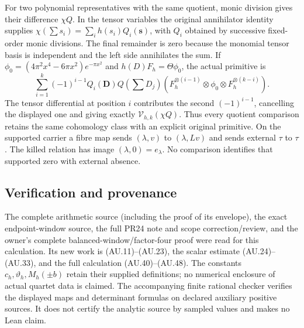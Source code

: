 For two polynomial representatives with the same quotient, monic
division gives their difference $\chi Q$. In the tensor variables
the original annihilator identity supplies
$\chi(\sum s_i)=\sum_i h(s_i)Q_i(\mathbf s)$, with $Q_i$ obtained
by successive fixed-order monic divisions. The final remainder is
zero because the monomial tensor basis is independent and the
left side annihilates the sum. If
$\phi_0=(4\pi^2x^4-6\pi x^2)e^{-\pi x^2}$ and
$h(D)F_h=\Theta\phi_0$, the actual primitive is
\[
 \sum_{i=1}^k(-1)^{i-1}Q_i(\mathbf D)Q(\textstyle\sum D_j)
  (F_h^{\otimes(i-1)}\otimes\phi_0\otimes
                         F_h^{\otimes(k-i)}).             \tag{AU.49}
\]
The tensor differential at position $i$ contributes the second
$(-1)^{i-1}$, cancelling the displayed one and giving exactly
$\mathcal V_{h,k}(\chi Q)$. Thus every quotient comparison retains
the same cohomology class with an explicit original primitive.
On the supported carrier a fibre map sends $(\lambda,v)$ to
$(\lambda,Lv)$ and sends external $\tau$ to $\tau$. The killed
relation has image $(\lambda,0)=e_\lambda$.
No comparison identifies that supported zero with external absence.

\subsection{Verification and provenance}

The complete arithmetic source (including the proof of its envelope),
the exact endpoint-window source, the full PR24 note and scope
correction/review, and the owner's complete balanced-window/factor-four
proof were read for this calculation. Its new work is (AU.11)--(AU.23),
the scalar estimate (AU.24)--(AU.33), and the full calculation
(AU.40)--(AU.48).
The constants $c_h,\vartheta_h,M_h(\pm b)$ retain their supplied
definitions; no numerical enclosure of actual quartet data is claimed.
The accompanying finite rational checker verifies the displayed maps
and determinant formulas on declared auxiliary positive sources.
It does not certify the analytic source by sampled values and makes
no Lean claim.


\endgroup
